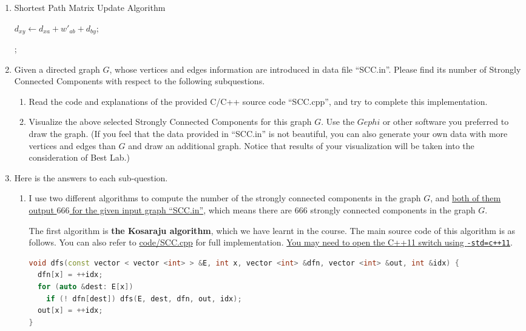 \documentclass[12pt,a4paper]{article}
\makeatletter
\newtheorem*{solution}{Solution}
\theoremstyle{definition}
\renewenvironment{solution}[1][Solution] {\par\pushQED{\qed}\normalfont\topsep6\p@\@plus6\p@\relax\trivlist\item[\hskip\labelsep\bfseries#1\@addpunct{.}]\ignorespaces}{\popQED\endtrivlist\@endpefalse} \makeatother
\makeatother
\begin{document}
\begin{enumerate}
\begin{solution}
\begin{center}
\begin{minipage}[t]{0.8\textwidth}
\begin{algorithm}[H]
            \BlankLine
            \caption{Shortest Path Matrix Update Algorithm}
            \label{alg1}

             {
                 {
                     {
                        $d_{xy} \leftarrow d_{xa} + w'_{ab} + d_{by}$;
                    }
                }
            }

            ;
        \end{algorithm}
        \end{minipage}
        \end{center}

    \end{solution}
    \clearpage

	\item Given a directed graph $G$, whose vertices and edges information are introduced in data file ``SCC.in''. Please find its number of Strongly Connected Components with respect to the following subquestions.
    \begin{enumerate}
    	\item Read the code and explanations of the provided C/C++ source code ``SCC.cpp'', and try to complete this implementation.
    	\item Visualize the above selected Strongly Connected Components for this graph $G$. Use the $Gephi$ or other software you preferred to draw the graph. {\color{blue}(If you feel that the data provided in ``SCC.in'' is not beautiful, you can also generate your own data with more vertices and edges than $G$ and draw an additional graph. Notice that results of your visualization will be taken into the consideration of Best Lab.)}

    \end{enumerate}
    \begin{solution} Here is the answers to each sub-question.
    \begin{enumerate}
    \item I use two different algorithms to compute the number of the strongly connected components in the graph $G$, and \underline{both of them output $666$ for the given input graph ``SCC.in''}, which means there are $666$ strongly connected components in the graph $G$.

        The first algorithm is \textbf{the Kosaraju algorithm}, which we have learnt in the course. The main source code of this algorithm is as follows. You can also refer to \href{code/SCC.cpp}{code/SCC.cpp} for full implementation. \underline{You may need to open the C++11 switch using \texttt{-std=c++11}}.
\begin{lstlisting}[language=C++]
void dfs(const vector < vector <int> > &E, int x, vector <int> &dfn, vector <int> &out, int &idx) {
  dfn[x] = ++idx;
  for (auto &dest: E[x])
    if (! dfn[dest]) dfs(E, dest, dfn, out, idx);
  out[x] = ++idx;
}


\end{lstlisting}
\end{enumerate}
\end{solution}
\end{enumerate}
\end{document}
